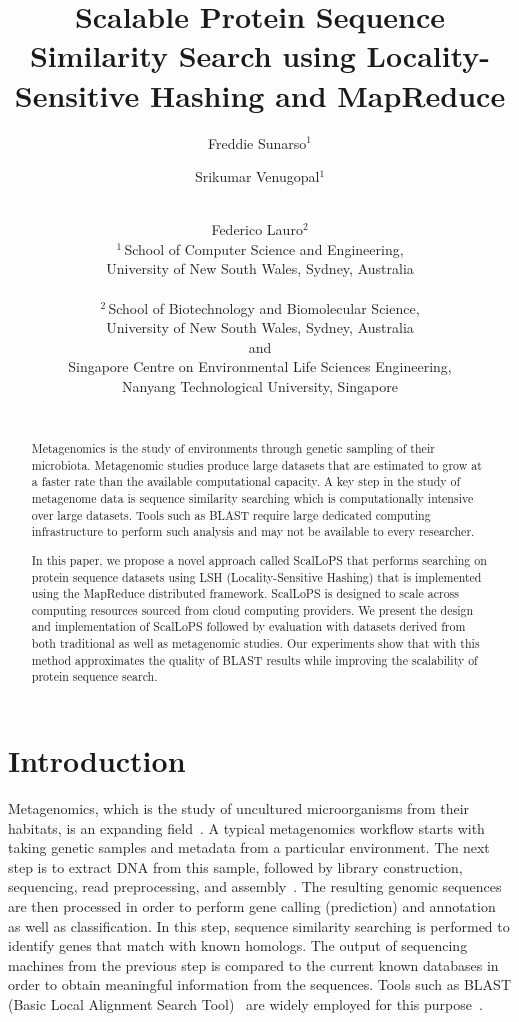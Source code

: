 \documentclass[titlepage]{csetr}
\title{Scalable Protein Sequence Similarity Search using Locality-Sensitive Hashing and MapReduce 
}
\author{Freddie Sunarso$^1$ \and Srikumar Venugopal$^1$ \and\\ Federico Lauro$^2$\\[2em]
  $^1\, $School of Computer Science and Engineering,\\University of New South Wales, Sydney, Australia \\\email{\{freddies,srikumarv\}@cse.unsw.edu.au}\\
  $^2\,$School of Biotechnology and Biomolecular Science, \\University of New South Wales, Sydney, Australia \\
  and \\Singapore Centre on Environmental Life Sciences Engineering,\\Nanyang Technological University, Singapore\\\email{flauro@unsw.edu.au}\\[3cm]
}
\date{}
\begin{document}
\maketitle

\begin{abstract}
Metagenomics is the study of environments through genetic sampling of their microbiota. Metagenomic studies produce large datasets that are estimated to grow at a faster rate than the available computational capacity. A key step in the study of metagenome data is sequence similarity searching which is computationally intensive over large datasets. Tools such as BLAST require large dedicated computing infrastructure to perform such analysis and may not be available to every researcher. 

In this paper, we propose a novel approach called ScalLoPS that performs searching on protein sequence datasets using LSH (Locality-Sensitive Hashing) that is implemented using the MapReduce distributed framework. ScalLoPS is designed to scale across computing resources sourced from cloud computing providers. We present the design and implementation of ScalLoPS followed by evaluation with datasets derived from both traditional as well as metagenomic studies. Our experiments show that with this method approximates the quality of BLAST results while improving the scalability of protein sequence search.
\end{abstract}

\section{Introduction}
\label{sec:Intro}

Metagenomics, which is the study of uncultured microorganisms from their habitats, is an expanding field~\cite{Metagenomics}. A typical metagenomics workflow starts with taking genetic samples and metadata from a particular environment. The next step is to extract DNA from this sample, followed by library construction, sequencing, read preprocessing, and assembly~\cite{Metagenomics2}. The resulting genomic sequences are then processed in order to perform gene calling (prediction) and annotation as well as classification. In this step, sequence similarity searching is performed to identify genes that match with known homologs. The output of sequencing machines from the previous step is compared to the current known databases in order to obtain meaningful information from the sequences. Tools such as BLAST (Basic Local Alignment Search Tool)~\cite{BLAST,GappedBLAST} are widely employed for this purpose~\cite{wooley_metagenomics_2010}. 
\end{document}
